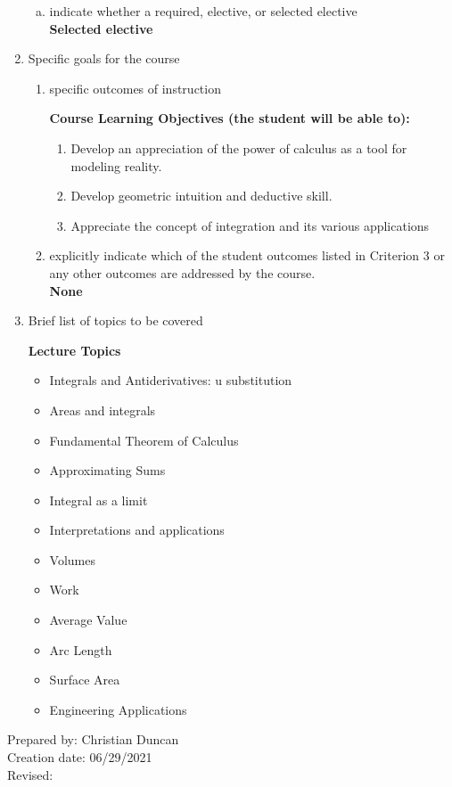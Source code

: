 \begin{enumerate}[1.]
\begin{enumerate}[a.]
\item indicate whether a required, elective, or selected elective\\ %
  {\bfseries
    Selected elective
  }

\end{enumerate}

\item Specific goals for the course
\begin{enumerate}
\item specific outcomes of instruction\\ %
  {\bfseries
    Course Learning Objectives (the student will be able to):
    \begin{enumerate}[1.]
    \item Develop an appreciation of the power of calculus as a tool for modeling reality.
    \item Develop geometric intuition and deductive skill.
    \item Appreciate the concept of integration and its various applications
    \end{enumerate}
  }

\item explicitly indicate which of the student outcomes listed in Criterion 3 or any other outcomes are addressed by the course.\\
  {\bfseries
    None
  }
\end{enumerate}

\item Brief list of topics to be covered\\
  {\bfseries
    Lecture Topics
    \begin{itemize}
      \item Integrals and Antiderivatives: u substitution
      \item Areas and integrals
      \item Fundamental Theorem of Calculus
      \item Approximating Sums
      \item Integral as a limit
      \item Interpretations and applications
      \item Volumes
      \item Work
      \item Average Value
      \item Arc Length
      \item Surface Area
      \item Engineering Applications
    \end{itemize}
  }

\end{enumerate}

\noindent Prepared by: Christian Duncan\\
\noindent Creation date: 06/29/2021\\
\noindent Revised:\\
